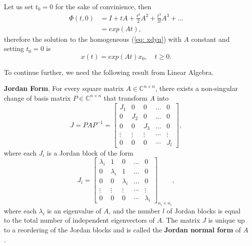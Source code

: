 Let us set $t_0 = 0$ for the sake of convinience, then
\begin{align}
	\Phi(t,0) &= I + tA + \frac{t^2}{2} A^2 + \frac{t^3}{3!} A^3 + \dots \nonumber \\
	&= exp(At),
\end{align}
therefore the solution to the homogeneous (\ref{eq: xdyn}) with $A$ constant and setting $t_0 = 0$ is
\begin{equation}
	x(t) = exp(At)x_0,\quad t\geq 0.
	\label{eq: xexp}
\end{equation}

To continue further, we need the following result from Linear Algebra.
\begin{theorem}
\textbf{Jordan Form}. For every square matrix $A\in\mathbb{C}^{n \times n}$, there exists a non-singular change of basis matrix $P\in\mathbb{C}^{n \times n}$ that transform $A$ into
\begin{equation}
	J = PAP^{-1} = \begin{bmatrix}
		J_1 & 0 & 0 & \dots & 0 \\
		0 & J_2 & 0 & \dots & 0 \\
		0 & 0 & J_3 & \dots & 0 \\
		\vdots & \vdots & \vdots & \cdots & \vdots \\
		0 & 0 & 0 & \cdots & J_l
	\end{bmatrix},
\end{equation}
where each $J_i$ is a Jordan block of the form
	\begin{equation}
	J_i = \begin{bmatrix}
\lambda_i & 1 & 0 & \dots & 0 \\
		0 & \lambda_i & 1 & \dots & 0 \\
		0 & 0 & \lambda_i & \dots & 0 \\
		\vdots & \vdots & \vdots & \cdots & \vdots \\
		0 & 0 & 0 & \cdots & \lambda_i
	\end{bmatrix}_{n_i\times n_i},
	\end{equation}
	where each $\lambda_i$ is an eigenvalue of $A$, and the number $l$ of Jordan blocks is equal to the total number of independent eigenvectors of $A$. The matrix $J$ is unique up to a reordering of the Jordan blocks and is called the \textbf{Jordan normal form} of $A$.
\end{theorem}

